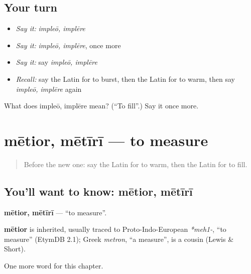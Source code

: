 \subsection*{Your turn}
\begin{itemize}
\raggedright
  \item \emph{Say it:} \emph{impleō, implēre}
  \item \emph{Say it:} \emph{impleō, implēre}, once more
  \item \emph{Say it:} say \emph{impleō, implēre}
  \item \emph{Recall:} say the Latin for to burst, then the Latin for to warm, then say \emph{impleō, implēre} again
\end{itemize}

\begin{tcolorbox}[breakable,colback=teal!4,colframe=teal!35!black,title={Before you move on}]
What does impleō, implēre mean? (\textquotedblleft{}To fill\textquotedblright{}.) Say it once more.
\end{tcolorbox}
\section[mētior, mētīrī]{mētior, mētīrī — to measure}

\label{lesson:LA-C255-metior}



\begin{quote}
Before the new one: say the Latin for to warm, then the Latin for to fill.
\end{quote}

\subsection*{You'll want to know: mētior, mētīrī}
\textbf{mētior, mētīrī} — \textquotedblleft{}to measure\textquotedblright{}.

\begin{cousinweb}
\textbf{mētior} is inherited, usually traced to Proto-Indo-European \emph{*meh1-}, \textquotedblleft{}to measure\textquotedblright{} (EtymDB 2.1); Greek \emph{metron}, \textquotedblleft{}a measure\textquotedblright{}, is a cousin (Lewis \& Short).
\end{cousinweb}

\begin{grammarlens}[title={What you've built}]
One more word for this chapter.
\end{grammarlens}

